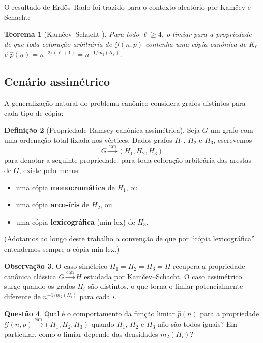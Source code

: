 \documentclass[reqno, 12pt]{amsart}
\numberwithin{equation}{section}
\theoremstyle{plain}
\newtheorem{theorem}{Teorema}[section]
\theoremstyle{definition}
\newtheorem{definition}[theorem]{Definição}
\newtheorem{question}[theorem]{Questão}
\newtheorem{remark}[theorem]{Observação}
\newcommand{\Gnp}{\mathcal{G}(n,p)}
\newcommand{\mdens}{m_2}
\begin{document}
O resultado de Erdős--Rado foi trazido para o contexto aleatório por Kamčev e Schacht:

\begin{theorem}[Kamčev--Schacht \cite{kamcev2023canonical}]
  \label{thm:kamcev}
  Para todo $\ell \ge 4$, o limiar para a propriedade de que toda coloração
  arbitrária de $\Gnp$ contenha uma cópia canônica de $K_\ell$ é
  $\hat{p}(n) = n^{-2/(\ell+1)} = n^{-1/\mdens(K_\ell)}$.
\end{theorem}

\subsection{Cenário assimétrico}

A generalização natural do problema canônico considera grafos distintos para cada tipo de cópia:

\begin{definition}[Propriedade Ramsey canônica assimétrica]
  \label{def:assimetrico}
  Seja $G$ um grafo com uma ordenação total fixada nos vértices.
  Dados grafos $H_1$, $H_2$ e $H_3$, escrevemos
  \[
    G \xrightarrow{\mathrm{can}} (H_1, H_2, H_3)
  \]
  para denotar a seguinte propriedade: para toda coloração arbitrária das
  arestas de $G$, existe pelo menos
  \begin{itemize}
    \item uma cópia \textbf{monocromática} de $H_1$, ou
    \item uma cópia \textbf{arco-íris} de $H_2$, ou
    \item uma cópia \textbf{lexicográfica} (min-lex) de $H_3$.
  \end{itemize}
  (Adotamos ao longo deste trabalho a convenção de que por ``cópia lexicográfica''
  entendemos sempre a cópia min-lex.)
\end{definition}

\begin{remark}
  O caso simétrico $H_1 = H_2 = H_3 = H$ recupera a propriedade canônica clássica
  $G \xrightarrow{\mathrm{can}} H$ estudada por Kamčev--Schacht.
  O caso assimétrico surge quando os grafos $H_i$ são distintos, o que torna
  o limiar potencialmente diferente de $n^{-1/\mdens(H_i)}$ para cada $i$.
\end{remark}

\begin{question}
  \label{q:assimetrico}
  Qual é o comportamento da função limiar $\hat{p}(n)$ para a propriedade
  $\Gnp \xrightarrow{\mathrm{can}} (H_1, H_2, H_3)$
  quando $H_1$, $H_2$ e $H_3$ não são todos iguais?
  Em particular, como o limiar depende das densidades $\mdens(H_i)$?
\end{question}
\end{document}
